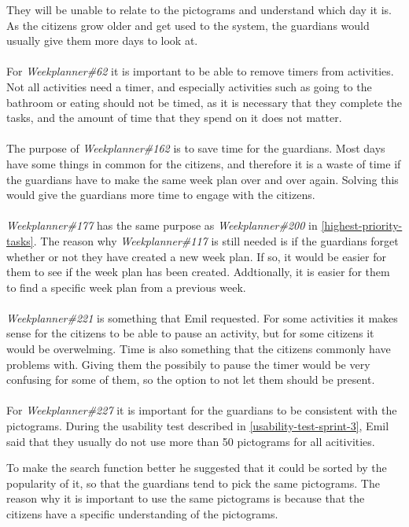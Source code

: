 They will be unable to relate to the pictograms and understand which day it is.
As the citizens grow older and get used to the system, the guardians would usually give them more days to look at.
\\\\
For \textit{Weekplanner\#62} it is important to be able to remove timers from activities. 
Not all activities need a timer, and especially activities such as going to the bathroom or eating should not be timed, as it is necessary that they complete the tasks, and the amount of time that they spend on it does not matter.
\\\\
The purpose of \textit{Weekplanner\#162} is to save time for the guardians. 
Most days have some things in common for the citizens, and therefore it is a waste of time if the guardians have to make the same week plan over and over again.
Solving this would give the guardians more time to engage with the citizens.
\\\\
\textit{Weekplanner\#177} has the same purpose as \textit{Weekplanner\#200} in \autoref{highest-priority-tasks}. 
The reason why \textit{Weekplanner\#117} is still needed is if the guardians forget whether or not they have created a new week plan.
If so, it would be easier for them to see if the week plan has been created.
Addtionally, it is easier for them to find a specific week plan from a previous week.
\\\\
\textit{Weekplanner\#221} is something that Emil requested. 
For some activities it makes sense for the citizens to be able to pause an activity, but for some citizens it would be overwelming.
Time is also something that the citizens commonly have problems with. 
Giving them the possibily to pause the timer would be very confusing for some of them, so the option to not let them should be present.
\\\\
For \textit{Weekplanner\#227} it is important for the guardians to be consistent with the pictograms.
During the usability test described in \autoref{usability-test-sprint-3}, Emil said that they usually do not use more than 50 pictograms for all acitivities.

To make the search function better he suggested that it could be sorted by the popularity of it, so that the guardians tend to pick the same pictograms.
The reason why it is important to use the same pictograms is because that the citizens have a specific understanding of the pictograms.

